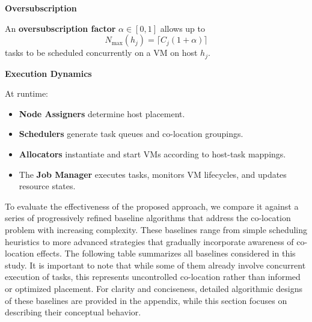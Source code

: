 \textbf{Oversubscription}

An \textbf{oversubscription factor} $\alpha \in [0,1]$ allows up to
\[
    N_{\max}(h_j) = \lceil C_j (1 + \alpha) \rceil
\]
tasks to be scheduled concurrently on a VM on host $h_j$.


\textbf{Execution Dynamics}

At runtime:
\begin{itemize}
    \item \textbf{Node Assigners} determine host placement.
    \item \textbf{Schedulers} generate task queues and co-location groupings.
    \item \textbf{Allocators} instantiate and start VMs according to host-task mappings.
    \item The \textbf{Job Manager} executes tasks, monitors VM lifecycles, and updates resource states.
\end{itemize}

To evaluate the effectiveness of the proposed approach, we compare it against a series of progressively refined baseline algorithms that address the co-location problem with increasing complexity. These baselines range from simple scheduling heuristics to more advanced strategies that gradually incorporate awareness of co-location effects. The following table summarizes all baselines considered in this study. It is important to note that while some of them already involve concurrent execution of tasks, this represents uncontrolled co-location rather than informed or optimized placement. For clarity and conciseness, detailed algorithmic designs of these baselines are provided in the appendix, while this section focuses on describing their conceptual behavior.

